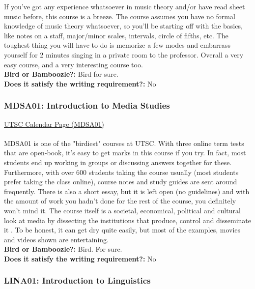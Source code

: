 \documentclass[11pt]{article}
\begin{document}
If you've got any experience whatsoever in music theory and/or have read sheet music before, this course is a breeze.  The course assumes you have no formal knowledge of music theory whatsoever, so you'll be starting off with the basics, like notes on a staff, major/minor scales, intervals, circle of fifths, etc.  The toughest thing you will have to do is memorize a few modes and embarrass yourself for 2 minutes singing in a private room to the professor. Overall a very easy course, and a very interesting course too.\\

\textbf{Bird or Bamboozle?:} Bird for sure.\\

\textbf{Does it satisfy the writing requirement?:} No

\subsubsection{MDSA01: Introduction to Media Studies}
\href{https://utsc.calendar.utoronto.ca/course/MDSA01H3}{UTSC Calendar Page (MDSA01)}\\\\
MDSA01 is one of the "birdiest" courses at UTSC. With three online term tests that are open-book, it's easy to get marks in this course if you try. In fact, most students end up working in groups or discussing answers together for these. Furthermore, with over 600 students taking the course usually (most students prefer taking the class online), course notes and study guides are sent around frequently. There is also a short essay, but it is left open (no guidelines) and with the amount of work you hadn't done for the rest of the course, you definitely won't mind it. The course itself is a societal, economical, political and cultural look at media by dissecting the institutions that produce, control and disseminate it  . To be honest, it can get dry quite easily, but most of the examples, movies and videos shown are entertaining.\\

\textbf{Bird or Bamboozle?:} Bird. For sure.\\

\textbf{Does it satisfy the writing requirement?:} No

\subsubsection{LINA01: Introduction to Linguistics}
\end{document}
